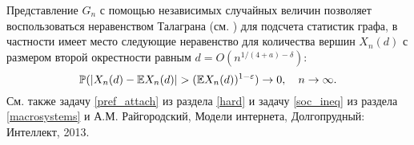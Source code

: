 \begin{remark}
Представление $G_n$  с помощью  независимых случайных величин позволяет воспользоваться неравенством Талаграна (см. \cite{15}) для подсчета статистик графа, в частности имеет место следующие неравенство для количества вершин $X_n(d)$ с размером второй окрестности равным $d = O(n^{1/(4+a) - \delta})$:
\[
\mathrm{{\mathbb P}}(|X_n(d) - \mathrm{{\mathbb E}} X_n(d)| > (\mathrm{{\mathbb E}} X_n(d))^{1-\varepsilon} ) \to 0, \quad n \to \infty.
\]  
См. также задачу \ref{pref_attach} из раздела \ref{hard} и задачу \ref{soc_ineq} из раздела \ref{macrosystems} и А.М. Райгородский, Модели интернета, Долгопрудный: Интеллект, 2013.
\end{remark}

